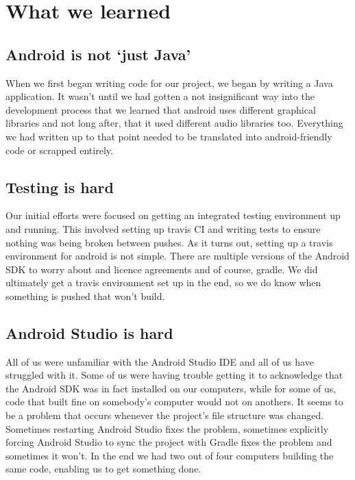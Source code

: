 \documentclass[11pt, oneside]{article}
\begin{document}
\pagebreak
\section*{What we learned}

\subsection*{Android is not `just Java'}

When we first began writing code for our project, we began by writing
a Java application. It wasn't until we had gotten a not insignificant
way into the development process that we learned that android uses
different graphical libraries and not long after, that it used
different audio libraries too. Everything we had written up to that
point needed to be translated into android-friendly code or scrapped
entirely.

\subsection*{Testing is hard}

Our initial efforts were focused on getting an integrated testing
environment up and running. This involved setting up travis CI and
writing tests to ensure nothing was being broken between pushes. As it
turns out, setting up a travis environment for android is not
simple. There are multiple versions of the Android SDK to worry about
and licence agreements and of course, gradle. We did ultimately get a
travis environment set up in the end, so we do know when something is
pushed that won't build.

\subsection*{Android Studio is hard}

All of us were unfamiliar with the Android Studio IDE and all of us
have struggled with it. Some of us were having trouble getting it to
acknowledge that the Android SDK was in fact installed on our
computers, while for some of us, code that built fine on somebody’s
computer would not on anothers. It seems to be a problem that occurs
whenever the project’s file structure was changed. Sometimes
restarting Android Studio fixes the problem, sometimes explicitly
forcing Android Studio to sync the project with Gradle fixes the
problem and sometimes it won’t. In the end we had two out of four
computers building the same code, enabling us to get something done.
\end{document}
